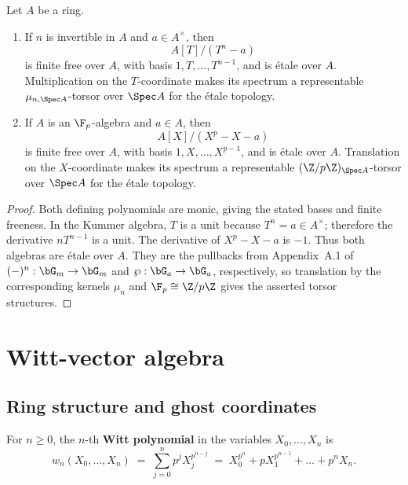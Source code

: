 \begin{lemma}
\label{lemma:classical_cyclic_equations_etale_torsors}
Let $A$ be a ring.
\begin{enumerate}[label=(\roman*)]
    \item If $n$ is invertible in $A$ and $a\in A^\times$, then
    \[
    A[T]/(T^n-a)
    \]
    is finite free over $A$, with basis $1,T,\dots,T^{n-1}$, and is
    \'etale over $A$. Multiplication on the $T$-coordinate makes its
    spectrum a representable $\mu_{n,\Spec A}$-torsor over $\Spec A$ for
    the \'etale topology.
    \item If $A$ is an $\F_p$-algebra and $a\in A$, then
    \[
    A[X]/(X^p-X-a)
    \]
    is finite free over $A$, with basis $1,X,\dots,X^{p-1}$, and is
    \'etale over $A$. Translation on the $X$-coordinate makes its spectrum
    a representable $(\Z/p\Z)_{\Spec A}$-torsor over $\Spec A$ for the
    \'etale topology.
\end{enumerate}
\end{lemma}

\begin{proof}
Both defining polynomials are monic, giving the stated bases and finite
freeness. In the Kummer algebra, $T$ is a unit because $T^n=a\in A^\times$;
therefore the derivative $nT^{n-1}$ is a unit. The derivative of
$X^p-X-a$ is $-1$. Thus both algebras are \'etale over $A$. They are the
pullbacks from Appendix~A.1 of $(-)^n:\bG_m\to\bG_m$ and
$\wp:\bG_a\to\bG_a$, respectively, so translation by the corresponding
kernels $\mu_n$ and $\F_p\cong\Z/p\Z$ gives the asserted torsor structures.
\end{proof}

\section{Witt-vector algebra}
\label{appendix:witt_vector_algebra_basics}

\subsection{Ring structure and ghost coordinates}

For $n \geq 0$, the $n$-th \textbf{Witt polynomial} in the variables $X_0, \dots, X_n$
is
\[
w_n(X_0, \dots, X_n) \;=\; \sum_{j=0}^{n} p^j X_j^{p^{n-j}}
\;=\; X_0^{p^n} + p X_1^{p^{n-1}} + \dots + p^n X_n .
\]

